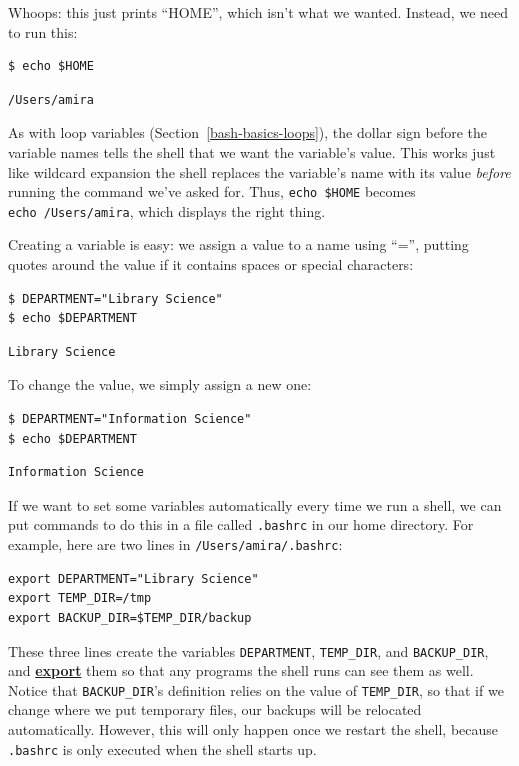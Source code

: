 \documentclass[
]{krantz}
\newcommand{\gref}[2]{\hyperlink{#2}{\textbf{#1}}}
\begin{document}
Whoops: this just prints ``HOME'', which isn't what we wanted.
Instead,
we need to run this:

\begin{verbatim}
$ echo $HOME
\end{verbatim}

\begin{verbatim}
/Users/amira
\end{verbatim}

As with loop variables (Section~\ref{bash-basics-loops}),
the dollar sign before the variable names tells the shell
that we want the variable's value.
This works just like wildcard expansion
the shell replaces the variable's name with its value
\emph{before} running the command we've asked for.
Thus,
\texttt{echo\ \$HOME} becomes \texttt{echo\ /Users/amira},
which displays the right thing.

Creating a variable is easy:
we assign a value to a name using ``='',
putting quotes around the value if it contains spaces or special characters:

\begin{verbatim}
$ DEPARTMENT="Library Science"
$ echo $DEPARTMENT
\end{verbatim}

\begin{verbatim}
Library Science
\end{verbatim}

To change the value, we simply assign a new one:

\begin{verbatim}
$ DEPARTMENT="Information Science"
$ echo $DEPARTMENT
\end{verbatim}

\begin{verbatim}
Information Science
\end{verbatim}

If we want to set some variables automatically every time we run a shell,
we can put commands to do this in a file called \texttt{.bashrc} in our home directory.
For example,
here are two lines in \texttt{/Users/amira/.bashrc}:

\begin{verbatim}
export DEPARTMENT="Library Science"
export TEMP_DIR=/tmp
export BACKUP_DIR=$TEMP_DIR/backup
\end{verbatim}

These three lines create the variables \texttt{DEPARTMENT},
\texttt{TEMP\_DIR},
and \texttt{BACKUP\_DIR},
and \gref{export}{export\_variable} them so that any programs the shell runs can see them as well.
Notice that \texttt{BACKUP\_DIR}'s definition relies on the value of \texttt{TEMP\_DIR},
so that if we change where we put temporary files,
our backups will be relocated automatically.
However,
this will only happen once we restart the shell,
because \texttt{.bashrc} is only executed when the shell starts up.
\end{document}
